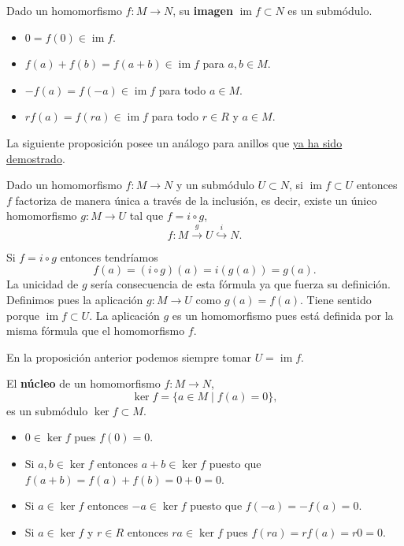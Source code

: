 
Dado un homomorfismo \(f\colon M\rightarrow N\), su \textbf{imagen}
\(\operatorname{im} f\subset N\) es un submódulo. 


\begin{itemize}
\item
  \(0=f(0)\in \operatorname{im} f\).
\item
  \(f(a)+f(b)=f(a+b)\in \operatorname{im} f\) para \(a,b\in M\).
\item
  \(-f(a)=f(-a)\in \operatorname{im} f\) para todo \(a\in M\).
\item
  \(rf(a)=f(ra)\in \operatorname{im} f\) para todo \(r\in R\) y
  \(a\in M\).
\end{itemize}


La siguiente proposición posee un análogo para anillos que
\href{/estalg/rings/definitions/\#factorimage}{ya ha sido demostrado}.

\label{factorimagemodules} Dado un homomorfismo
\(f\colon M\rightarrow N\) y un submódulo \(U\subset N\), si
\(\operatorname{im} f\subset U\) entonces \(f\) factoriza de manera
única a través de la inclusión, es decir, existe un único homomorfismo
\(g\colon M\rightarrow U\) tal que \(f=i\circ g\),
\[f\colon M\stackrel{g}\rightarrow U\stackrel{i}\hookrightarrow N.\]


Si \(f=i\circ g\) entonces tendríamos
\[f(a)=(i\circ g)(a)=i(g(a))=g(a).\] La unicidad de \(g\) sería
consecuencia de esta fórmula ya que fuerza su definición. Definimos pues
la aplicación \(g\colon M\rightarrow U\) como \(g(a)=f(a)\). Tiene
sentido porque \(\operatorname{im}f\subset U\). La aplicación \(g\) es
un homomorfismo pues está definida por la misma fórmula que el
homomorfismo \(f\).\\


En la proposición anterior podemos siempre tomar
\(U=\operatorname{im} f\). 


El \textbf{núcleo} de un homomorfismo \(f\colon M\rightarrow N\),
\[\ker f=\{a\in M\mid f(a)=0\},\] es un submódulo \(\ker f\subset M\).


\begin{itemize}
\item
  \(0\in\ker f\) pues \(f(0)=0\).
\item
  Si \(a,b\in\ker f\) entonces \(a+b\in \ker f\) puesto que
  \(f(a+b)=f(a)+f(b)=0+0=0\).
\item
  Si \(a\in\ker f\) entonces \(-a\in \ker f\) puesto que
  \(f(-a)=-f(a)=0\).
\item
  Si \(a\in\ker f\) y \(r\in R\) entonces \(ra\in \ker f\) pues
  \(f(ra)=rf(a)=r0=0\).
\end{itemize}


